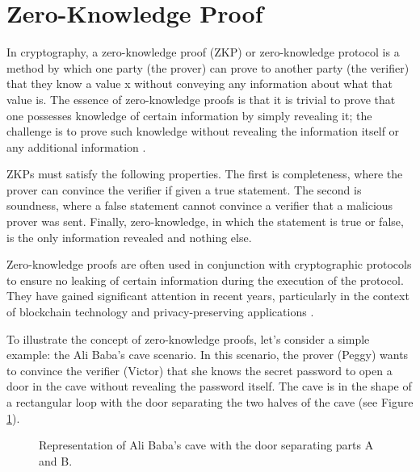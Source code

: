\section{Zero-Knowledge Proof}
In cryptography, a zero-knowledge proof (ZKP) or zero-knowledge protocol is a method by which one party (the prover) can prove to another party (the verifier) that they know a value x without conveying any information about what that value is. The essence of zero-knowledge proofs is that it is trivial to prove that one possesses knowledge of certain information by simply revealing it; the challenge is to prove such knowledge without revealing the information itself or any additional information \cite{goldreich1986proofs}.

ZKPs must satisfy the following properties. The first is completeness, where the prover can convince the verifier if given a true statement. The second is soundness, where a false statement cannot convince a verifier that a malicious prover was sent. Finally, zero-knowledge, in which the statement is true or false, is the only information revealed and nothing else.

Zero-knowledge proofs are often used in conjunction with cryptographic protocols to ensure no leaking of certain information during the execution of the protocol. They have gained significant attention in recent years, particularly in the context of blockchain technology and privacy-preserving applications \cite{bensasson2014zerocash}.

To illustrate the concept of zero-knowledge proofs, let's consider a simple example: the Ali Baba's cave scenario. In this scenario, the prover (Peggy) wants to convince the verifier (Victor) that she knows the secret password to open a door in the cave without revealing the password itself. The cave is in the shape of a rectangular loop with the door separating the two halves of the cave (see Figure \ref{fig:rectangles_t}).

\begin{figure}[h]
\centering
{}
\caption{Representation of Ali Baba's cave with the door separating parts A and B.}
\label{fig:rectangles_t}
\end{figure}

